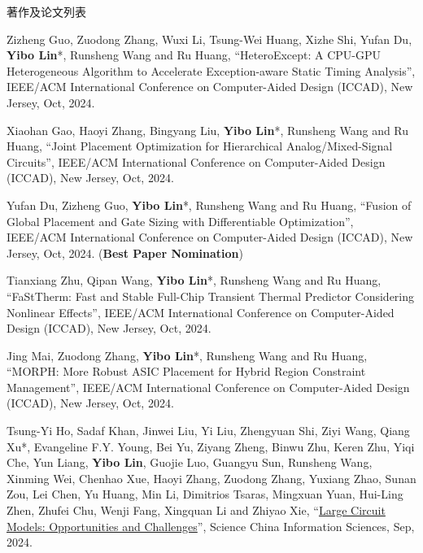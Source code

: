 \begin{rSection}{著作及论文列表}
\begin{description}[font=\normalfont, rightmargin=2em]
{}
            

\item[{[C163]}]{
        Zizheng Guo, Zuodong Zhang, Wuxi Li, Tsung-Wei Huang, Xizhe Shi, Yufan Du, \textbf{Yibo Lin}*, Runsheng Wang and Ru Huang, 
    ``HeteroExcept: A CPU-GPU Heterogeneous Algorithm to Accelerate Exception-aware Static Timing Analysis'', 
    IEEE/ACM International Conference on Computer-Aided Design (ICCAD), New Jersey, Oct, 2024.
    
}
            

\item[{[C162]}]{
        Xiaohan Gao, Haoyi Zhang, Bingyang Liu, \textbf{Yibo Lin}*, Runsheng Wang and Ru Huang, 
    ``Joint Placement Optimization for Hierarchical Analog/Mixed-Signal Circuits'', 
    IEEE/ACM International Conference on Computer-Aided Design (ICCAD), New Jersey, Oct, 2024.
    
}
            

\item[{[C161]}]{
        Yufan Du, Zizheng Guo, \textbf{Yibo Lin}*, Runsheng Wang and Ru Huang, 
    ``Fusion of Global Placement and Gate Sizing with Differentiable Optimization'', 
    IEEE/ACM International Conference on Computer-Aided Design (ICCAD), New Jersey, Oct, 2024.
    (\textbf{Best Paper Nomination})
}
            

\item[{[C160]}]{
        Tianxiang Zhu, Qipan Wang, \textbf{Yibo Lin}*, Runsheng Wang and Ru Huang, 
    ``FaStTherm: Fast and Stable Full-Chip Transient Thermal Predictor Considering Nonlinear Effects'', 
    IEEE/ACM International Conference on Computer-Aided Design (ICCAD), New Jersey, Oct, 2024.
    
}
            

\item[{[C159]}]{
        Jing Mai, Zuodong Zhang, \textbf{Yibo Lin}*, Runsheng Wang and Ru Huang, 
    ``MORPH: More Robust ASIC Placement for Hybrid Region Constraint Management'', 
    IEEE/ACM International Conference on Computer-Aided Design (ICCAD), New Jersey, Oct, 2024.
    
}
            

\item[{[J158]}]{
        Tsung-Yi Ho, Sadaf Khan, Jinwei Liu, Yi Liu, Zhengyuan Shi, Ziyi Wang, Qiang Xu*, Evangeline F.Y. Young, Bei Yu, Ziyang Zheng, Binwu Zhu, Keren Zhu, Yiqi Che, Yun Liang, \textbf{Yibo Lin}, Guojie Luo, Guangyu Sun, Runsheng Wang, Xinming Wei, Chenhao Xue, Haoyi Zhang, Zuodong Zhang, Yuxiang Zhao, Sunan Zou, Lei Chen, Yu Huang, Min Li, Dimitrios Tsaras, Mingxuan Yuan, Hui-Ling Zhen, Zhufei Chu, Wenji Fang, Xingquan Li and Zhiyao Xie, 
    ``\href{https://doi.org/10.1007/s11432-024-4155-7}{Large Circuit Models: Opportunities and Challenges}'', 
    Science China Information Sciences, Sep, 2024.
    
}
\end{description}
\end{rSection}
